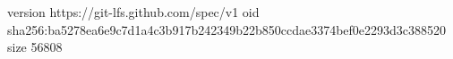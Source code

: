 version https://git-lfs.github.com/spec/v1
oid sha256:ba5278ea6e9c7d1a4c3b917b242349b22b850ccdae3374bef0e2293d3c388520
size 56808
